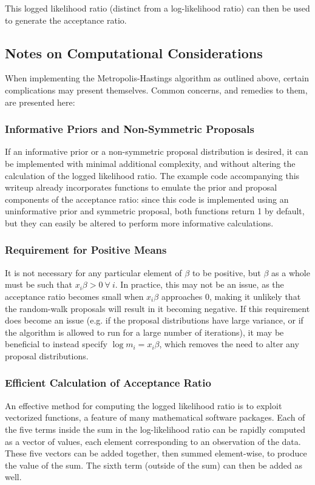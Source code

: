\documentclass[12pt]{article}
\begin{document}
	This logged likelihood ratio (distinct from a log-likelihood ratio) can then be used to generate the acceptance ratio.
	
	\subsection{Notes on Computational Considerations}
	When implementing the Metropolis-Hastings algorithm as outlined above, certain complications may present themselves. Common concerns, and remedies to them, are presented here:
	
	\subsubsection{Informative Priors and Non-Symmetric Proposals}
	If an informative prior or a non-symmetric proposal distribution is desired, it can be implemented with minimal additional complexity, and without altering the calculation of the logged likelihood ratio. The example code accompanying this writeup already incorporates functions to emulate the prior and proposal components of the acceptance ratio: since this code is implemented using an uninformative prior and symmetric proposal, both functions return 1 by default, but they can easily be altered to perform more informative calculations.
	
	\subsubsection{Requirement for Positive Means}
	It is not necessary for any particular element of $\beta$ to be positive, but $\beta$ as a whole must be such that $x_i \beta > 0~\forall~i$. In practice, this may not be an issue, as the acceptance ratio becomes small when $x_i\beta$ approaches 0, making it unlikely that the random-walk proposals will result in it becoming negative. If this requirement does become an issue (e.g. if the proposal distributions have large variance, or if the algorithm is allowed to run for a large number of iterations), it may be beneficial to instead specify $\log m_i = x_i \beta$, which removes the need to alter any proposal distributions.
	
	\subsubsection{Efficient Calculation of Acceptance Ratio}
	An effective method for computing the logged likelihood ratio is to exploit vectorized functions, a feature of many mathematical software packages. Each of the five terms inside the sum in the log-likelihood ratio can be rapidly computed as a vector of values, each element corresponding to an observation of the data. These five vectors can be added together, then summed element-wise, to produce the value of the sum. The sixth term (outside of the sum) can then be added as well.
	
\end{document}

